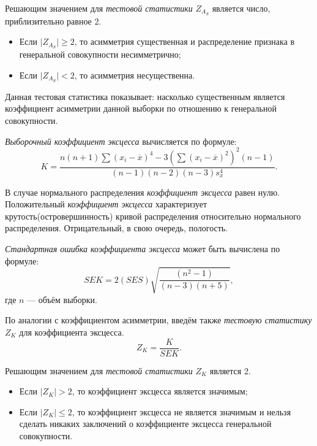 Решающим значением для \textit{тестовой статистики} $Z_{A_S}$ является число, приблизительно равное $2$.
\begin{itemize}
	\item Если $\vert Z_{A_S} \vert \ge 2$, то асимметрия существенная и распределение признака в генеральной совокупности несимметрично;
	\item Если $\vert Z_{A_S} \vert < 2$, то асимметрия несущественна.
\end{itemize}
Данная тестовая статистика показывает: насколько существенным является коэффициент асимметрии данной выборки по отношению к генеральной совокупности. 

\textit{Выборочный коэффициент эксцесса} вычисляется по формуле:
\begin{equation*}
	K = \frac{n(n + 1) \sum{(x_i - \overline{x})^4} - 3(\sum{(x_i - \overline{x})^2})^2 (n - 1)}{(n - 1)(n - 2)(n - 3)s_x^4}.
\end{equation*}

В случае нормального распределения \textit{коэффициент эксцесса} равен нулю. Положительный \textit{коэффициент эксцесса} характеризует крутость(островершинность) кривой распределения относительно нормального распределения. Отрицательный, в свою очередь, пологость.

\textit{Стандартная ошибка коэффициента эксцесса} может быть вычислена по формуле:
\begin{equation*}
	SEK = 2(SES) \sqrt{\frac{(n^2 - 1)}{(n - 3)(n + 5)}},
\end{equation*}
где $n$ --- объём выборки.

По аналогии с коэффициентом асимметрии, введём также \textit{тестовую статистику} $Z_K$ для коэффициента эксцесса.
\begin{equation*}
	Z_K = \frac{K}{SEK}.
\end{equation*}

Решающим значением для \textit{тестовой статистики} $Z_K$ является 2.
\begin{itemize}
	\item Если $\vert Z_K \vert > 2$, то коэффициент эксцесса является значимым;
	\item Если $\vert Z_K \vert \le 2$, то коэффициент эксцесса не является значимым и нельзя сделать никаких заключений о коэффициенте эксцесса генеральной совокупности.
\end{itemize}


